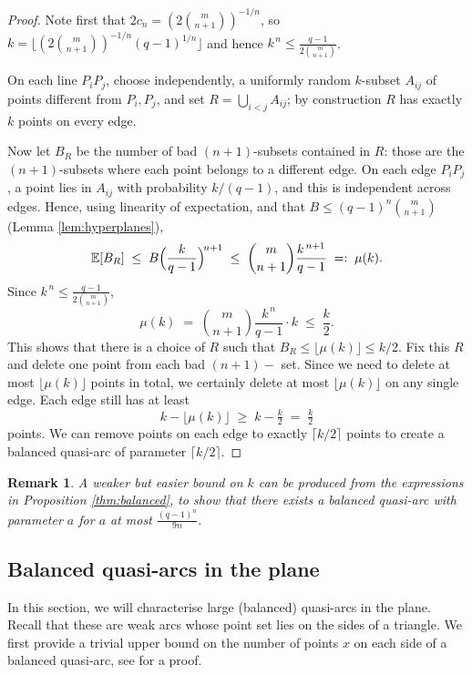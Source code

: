 \documentclass{article}
\newtheorem{remark}{Remark}
\newcommand{\E}{\mathbb{E}}
\begin{document}
\begin{proof}
Note first that $2c_n=(2\binom{m}{n+1})^{-1/n}$, so
$k=\lfloor(2\binom{m}{n+1})^{-1/n}(q-1)^{1/n}\rfloor$ and hence
$k^{\,n}\le \frac{q-1}{2\binom{m}{n+1}}$.

On each line $P_iP_j$, choose independently, a uniformly random $k$-subset
$A_{ij}$ of points different from $P_i,P_j$, and set $R=\bigcup_{i<j}A_{ij}$; by
construction $R$ has exactly $k$ points on every edge.

Now let $B_R$ be the number of bad $(n+1)$-subsets contained in $R$: those are the $(n+1)$-subsets where each point belongs to a different edge.
On each edge $P_iP_j$, a point lies in
$A_{ij}$ with probability $k/(q-1)$, and this is independent across edges. Hence,
using linearity of expectation, and that $B\le(q-1)^n\binom{m}{n+1}$ (Lemma \ref{lem:hyperplanes}),
\[
\E[B_R]\;\le\;B\Bigl(\frac{k}{q-1}\Bigr)^{\!n+1}
\;\le\;\binom{m}{n+1}\frac{k^{\,n+1}}{q-1}\;=:\;\mu(k).
\]
Since $k^{\,n}\le \frac{q-1}{2\binom{m}{n+1}}$,
\[
\mu(k)\;=\;\binom{m}{n+1}\frac{k^{\,n}}{q-1}\cdot k\;\le\;\frac{k}{2}.
\]
This shows that there is a choice of $R$ such that $B_R\le\lfloor\mu(k)\rfloor\le k/2$. Fix this $R$ and delete one point from each bad $(n+1)-$ set. Since we need to delete at most $\lfloor\mu(k)\rfloor$ points in total, we certainly delete at most $\lfloor\mu(k)\rfloor$ on any single edge. Each edge still has at least
\[
k-\lfloor\mu(k)\rfloor\;\ge\;k-\tfrac{k}{2}\;=\;\tfrac{k}{2}
\]
points. We can remove points on each edge to exactly $\lceil k/2\rceil$ points to create a balanced quasi-arc of parameter
$\lceil k/2\rceil$.
\end{proof}
\begin{remark}
    A weaker but easier bound on $k$ can be produced from the expressions in Proposition \ref{thm:balanced}, to show that there exists a balanced quasi-arc with parameter $a$ for $a$ at most $\frac{(q-1)^n}{9n}$.
\end{remark}

\subsection{Balanced quasi-arcs in the plane}\label{subs:planar}

In this section, we will characterise large (balanced) quasi-arcs in the plane. Recall that these are weak arcs whose point set lies on the sides of a triangle. 
We first provide a trivial upper bound on the number of points $x$ on each side of a balanced quasi-arc, see \cite[Proposition 9]{GruicaMontanucciZullo2026} for a proof.
\end{document}
